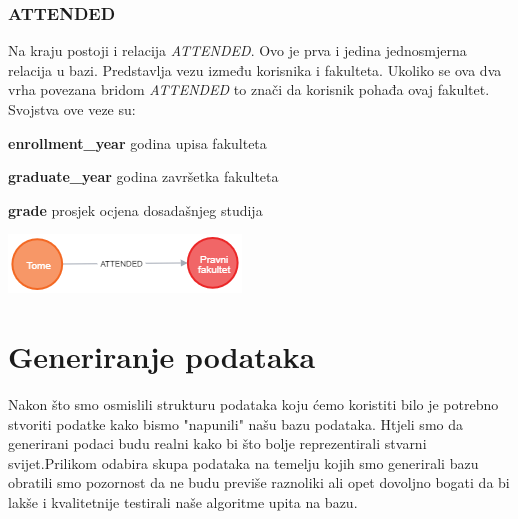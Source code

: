 \documentclass[titlepage, 12pt]{scrartcl}
\begin{document}
\subsubsection{ATTENDED}
Na kraju postoji i relacija \emph{ATTENDED}. Ovo je prva i jedina jednosmjerna relacija u bazi. Predstavlja vezu između korisnika i fakulteta. Ukoliko se ova dva vrha povezana bridom \emph{ATTENDED} to znači da korisnik pohađa ovaj fakultet. \\
Svojstva ove veze su:
\begin{itemize}
\begin{samepage}
    \item \textbf{enrollment\_year} godina upisa fakulteta
    \item \textbf{graduate\_year} godina završetka fakulteta
    \item \textbf{grade} prosjek ocjena dosadašnjeg studija
\end{samepage}
\end{itemize}
\begin{center}
    \includegraphics{slike/ATTENDED.png}    
\end{center}

\newpage

\section{Generiranje podataka}
Nakon što smo osmislili strukturu podataka koju ćemo koristiti bilo je potrebno stvoriti podatke kako bismo "napunili" našu bazu podataka. Htjeli smo da generirani podaci budu realni kako bi što bolje reprezentirali stvarni svijet.Prilikom odabira skupa podataka na temelju kojih smo generirali bazu obratili smo pozornost da ne budu previše raznoliki ali opet dovoljno bogati da bi lakše i kvalitetnije testirali naše algoritme upita na bazu.
\end{document}
